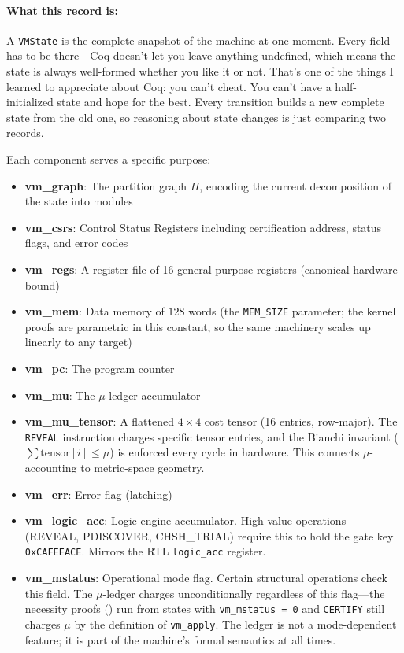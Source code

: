 \paragraph{What this record is:} A \texttt{VMState} is the complete snapshot of the machine at one moment. Every field has to be there---Coq doesn't let you leave anything undefined, which means the state is always well-formed whether you like it or not. That's one of the things I learned to appreciate about Coq: you can't cheat. You can't have a half-initialized state and hope for the best. Every transition builds a new complete state from the old one, so reasoning about state changes is just comparing two records.

Each component serves a specific purpose:
\begin{itemize}
    \item \textbf{vm\_graph}: The partition graph $\Pi$, encoding the current decomposition of the state into modules
    \item \textbf{vm\_csrs}: Control Status Registers including certification address, status flags, and error codes
    \item \textbf{vm\_regs}: A register file of 16 general-purpose registers (canonical hardware bound)
    \item \textbf{vm\_mem}: Data memory of $128$ words (the \texttt{MEM\_SIZE} parameter; the kernel proofs are parametric in this constant, so the same machinery scales up linearly to any target)
    \item \textbf{vm\_pc}: The program counter
    \item \textbf{vm\_mu}: The $\mu$-ledger accumulator
    \item \textbf{vm\_mu\_tensor}: A flattened $4 \times 4$ cost tensor (16 entries, row-major). The \texttt{REVEAL} instruction charges specific tensor entries, and the Bianchi invariant ($\sum\text{tensor}[i] \le \mu$) is enforced every cycle in hardware. This connects $\mu$-accounting to metric-space geometry.
    \item \textbf{vm\_err}: Error flag (latching)
    \item \textbf{vm\_logic\_acc}: Logic engine accumulator. High-value operations (REVEAL, PDISCOVER, CHSH\_TRIAL) require this to hold the gate key \texttt{0xCAFEEACE}. Mirrors the RTL \texttt{logic\_acc} register.
    \item \textbf{vm\_mstatus}: Operational mode flag. Certain structural operations check this field. The $\mu$-ledger charges unconditionally regardless of this flag---the necessity proofs () run from states with \texttt{vm\_mstatus = 0} and \texttt{CERTIFY} still charges $\mu$ by the definition of \texttt{vm\_apply}. The ledger is not a mode-dependent feature; it is part of the machine's formal semantics at all times.

\end{itemize}
